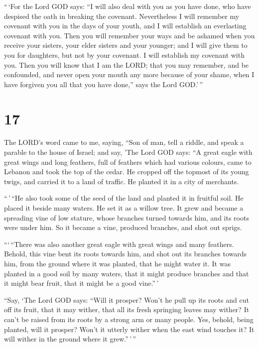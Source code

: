  ``\,`For the Lord GOD says: ``I will also deal with you
as you have done, who have despised the oath in breaking the covenant.
 Nevertheless I will remember my covenant with you in the
days of your youth, and I will establish an everlasting covenant with
you.  Then you will remember your ways and be ashamed
when you receive your sisters, your elder sisters and your younger; and
I will give them to you for daughters, but not by your covenant.
 I will establish my covenant with you. Then you will
know that I am the LORD;  that you may remember, and be
confounded, and never open your mouth any more because of your shame,
when I have forgiven you all that you have done,'' says the Lord
GOD.'\,''

\hypertarget{section-15}{%
\section{17}\label{section-15}}

 The LORD's word came to me, saying,  ``Son
of man, tell a riddle, and speak a parable to the house of Israel;
 and say, 'The Lord GOD says: ``A great eagle with great
wings and long feathers, full of feathers which had various colours,
came to Lebanon and took the top of the cedar.  He cropped
off the topmost of its young twigs, and carried it to a land of traffic.
He planted it in a city of merchants.

 ``\,'\,``He also took some of the seed of the land and
planted it in fruitful soil. He placed it beside many waters. He set it
as a willow tree.  It grew and became a spreading vine of
low stature, whose branches turned towards him, and its roots were under
him. So it became a vine, produced branches, and shot out sprigs.

 ```\,``There was also another great eagle with great
wings and many feathers. Behold, this vine bent its roots towards him,
and shot out its branches towards him, from the ground where it was
planted, that he might water it.  It was planted in a good
soil by many waters, that it might produce branches and that it might
bear fruit, that it might be a good vine.''\,'

 ``Say, `The Lord GOD says: ``Will it prosper? Won't he
pull up its roots and cut off its fruit, that it may wither, that all
its fresh springing leaves may wither? It can't be raised from its roots
by a strong arm or many people.  Yes, behold, being
planted, will it prosper? Won't it utterly wither when the east wind
touches it? It will wither in the ground where it grew.''\,'\,''

